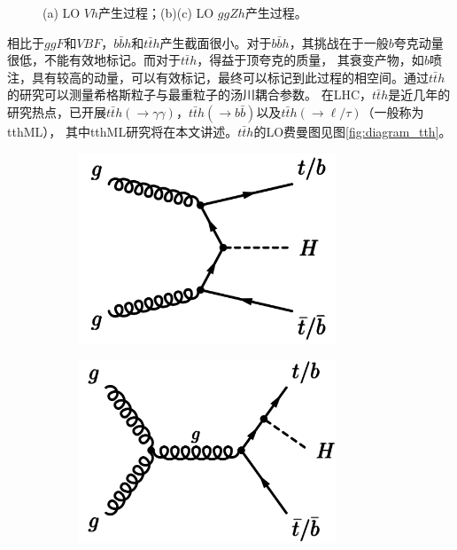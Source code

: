 \begin{figure}[h]
\begin{subfigure}[b]{0.33\textwidth}
  \caption{}
  \label{fig:diagram_ggzh1}
 \end{subfigure}
\caption{(a) LO $Vh$产生过程；(b)(c) LO $ggZh$产生过程。}
\label{fig:Vh_ggZh}
\end{figure}

相比于$ggF$和$VBF$，$b\bar{b}h$和$t\bar{t}h$产生截面很小。对于$b\bar{b}h$，其挑战在于一般$b$夸克动量很低，不能有效地标记。而对于$t\bar{t}h$，得益于顶夸克的质量，
其衰变产物，如$b$喷注，具有较高的动量，可以有效标记，最终可以标记到此过程的相空间。通过$t\bar{t}h$的研究可以测量希格斯粒子与最重粒子的汤川耦合参数。
在LHC，$t\bar{t}h$是近几年的研究热点，已开展$t\bar{t}h(\rightarrow\gamma\gamma)$，$t\bar{t}h(\rightarrow b\bar{b})$以及$t\bar{t}h(\rightarrow \ell/\tau)$（一般称为tthML），
其中tthML研究将在本文讲述。$t\bar{t}h$的LO费曼图见图\ref{fig:diagram_tth}。
\begin{figure}[h]
\centering
 \begin{subfigure}[b]{0.33\textwidth}
  \includegraphics[width=0.85\textwidth]{fig/diagram_tth1_LO.png}
  \caption{}
 \end{subfigure}
 \begin{subfigure}[b]{0.33\textwidth}
  \includegraphics[width=0.85\textwidth]{fig/diagram_tth2_LO.png}

\end{subfigure}
\end{figure}
